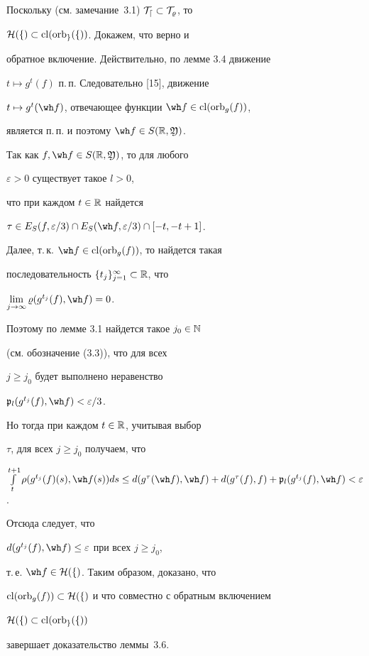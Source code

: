 \begin{pf}


Поскольку (см. замечание~3.1) $\cal T_d\subset\cal T_\varrho$, то


$\cal H(f)\subset\operatorname{cl}(\operatorname{orb}_g(f))$. Докажем, что верно и


обратное включение. Действительно, по лемме 3.4 движение


$t\mapsto g^t(f)$ п.\,п. Следовательно [15], движение


$t\mapsto g^t(\wh f)$, отвечающее функции $\wh f\in\cl(\orb_g(f))$,


является п.\,п. и поэтому $\wh f\in S(\Bbb R,\frak Y)$.


Так как $f, \wh f\in S(\Bbb R,\frak Y)$, то для любого


$\varepsilon>0$ существует такое $l>0$,


что при каждом $t\in\Bbb R$ найдется


$\tau\in E_S(f,\varepsilon/3)\cap E_S(\wh f,\varepsilon/3)\cap[-t,-t+1]$.


Далее, т.\,к. $\wh f\in\cl(\orb_g(f))$, то найдется такая


последовательность $\{t_{j}\}_{j=1}^\infty\subset\Bbb R$, что


$\lim\limits_{j\to\infty}\varrho(g^{t_j}(f),\wh f)=0$.


Поэтому по лемме 3.1 найдется такое $j_0\in\Bbb N$


(см. обозначение (3.3)), что для всех


$j\ge j_0$ будет выполнено неравенство


$\frak p_l(g^{t_j}(f),\wh f)<\varepsilon/3$.


Но тогда при каждом $t\in\Bbb R$, учитывая выбор


$\tau$, для всех $j\ge j_0$ получаем, что


$\int\limits_t^{t+1}\rho(g^{t_j}(f)(s),\wh f(s))ds\le


d(g^\tau(\wh f),\wh f)+d(g^\tau(f),f)+


\frak p_l(g^{t_j}(f),\wh f)<\varepsilon$.


Отсюда следует, что 


$d(g^{t_j}(f),\wh f)\le\varepsilon$ при всех $j\ge j_0$,


т.\,е. $\wh f\in\cal H(f)$. Таким образом, доказано, что


$\operatorname{cl}(\operatorname{orb}_g(f))\subset\cal H(f)$ и что совместно с обратным включением


$\cal H(f)\subset\operatorname{cl}(\operatorname{orb}_g(f))$


завершает доказательство леммы~3.6.


\end{pf}






